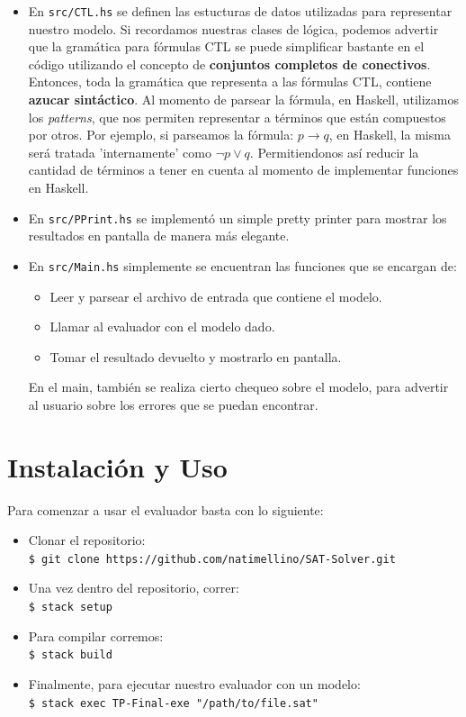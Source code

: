 \documentclass[11pt]{article}
\begin{document}
\begin{itemize}
  \item En \texttt{src/CTL.hs} se definen las estucturas de datos
        utilizadas para representar nuestro modelo. Si recordamos 
        nuestras clases de lógica, podemos advertir que la gramática para fórmulas CTL
        se puede simplificar bastante en el código utilizando el concepto de \textbf{conjuntos completos de conectivos}.
        Entonces, toda la gramática que representa a las fórmulas CTL, contiene
        \textbf{azucar sintáctico}. Al momento de parsear la fórmula, en Haskell, 
        utilizamos los \emph{patterns}, que nos permiten representar a términos
        que están compuestos por otros. Por ejemplo, si parseamos la fórmula:
        $p \rightarrow q$, en Haskell, la misma será tratada 'internamente' como 
        $\neg p \lor q$. Permitiendonos así reducir la cantidad de términos
        a tener en cuenta al momento de implementar funciones en Haskell. 
  \item En \texttt{src/PPrint.hs} se implementó un simple pretty printer
        para mostrar los resultados en pantalla de manera más elegante.
  \item En \texttt{src/Main.hs} simplemente se encuentran las funciones que
        se encargan de:
        \begin{itemize}
          \item Leer y parsear el archivo de entrada que contiene el modelo.
          \item Llamar al evaluador con el modelo dado.
          \item Tomar el resultado devuelto y mostrarlo en pantalla.
        \end{itemize}
        En el main, también se realiza cierto chequeo sobre el modelo, para
        advertir al usuario sobre los errores que se puedan encontrar.
\end{itemize}

\section{Instalación y Uso}

Para comenzar a usar el evaluador basta con lo siguiente:

\begin{itemize}
  \item Clonar el repositorio: \\
        \texttt{\$ git clone https://github.com/natimellino/SAT-Solver.git}
  \item Una vez dentro del repositorio, correr: \\
        \texttt{\$ stack setup}
  \item Para compilar corremos: \\
        \texttt{\$ stack build}
  \item Finalmente, para ejecutar nuestro evaluador con un modelo: \\
        \texttt{\$ stack exec TP-Final-exe "/path/to/file.sat"}
\end{itemize}
\end{document}
